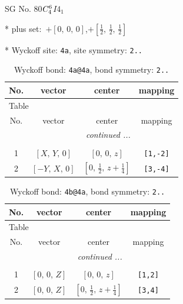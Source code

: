 \documentclass[fleqn,8pt]{jsarticle}
\begin{document}
\setcounter{MaxMatrixCols}{32}

\renewcommand{\tablename}{Table~}
\renewcommand{\figurename}{Figure~}
\begin{center}
\LARGE
SG No. 80\quad$C_{\rm 4}^{6}$\quad$I4_1$\quad[ tetragonal ]
\end{center}

* plus set:\,\,\,$+\left[ 0,\, 0,\, 0 \right]$,\quad $+\left[ \frac{1}{2},\, \frac{1}{2},\, \frac{1}{2} \right]$


* Wyckoff site: {\tt 4a}, site symmetry: {\tt 2..}
\renewcommand{\arraystretch}{1.2}
\begin{longtable}{cccc}
\caption{Wyckoff bond: {\tt 4a@4a}, bond symmetry: {\tt 2..}}
 \\
 \hline \hline
No. & vector & center & mapping \\ \hline \endfirsthead

\multicolumn{3}{l}{\tablename\ \thetable{}} \\
 \hline \hline
No. & vector & center & mapping \\ \hline \endhead

 \hline \hline
\multicolumn{3}{r}{\footnotesize\it continued ...} \\ \endfoot

 \hline \hline
\multicolumn{3}{r}{} \\ \endlastfoot

1 & $\left[ X,\, Y,\, 0 \right]$ & $\left[ 0,\, 0,\, z \right]$ & {\tt [1,-2]} \\ \hline
2 & $\left[ - Y,\, X,\, 0 \right]$ & $\left[ 0,\, \frac{1}{2},\, z + \frac{1}{4} \right]$ & {\tt [3,-4]} \\
\end{longtable}
\renewcommand{\arraystretch}{1.2}
\begin{longtable}{cccc}
\caption{Wyckoff bond: {\tt 4b@4a}, bond symmetry: {\tt 2..}}
 \\
 \hline \hline
No. & vector & center & mapping \\ \hline \endfirsthead

\multicolumn{3}{l}{\tablename\ \thetable{}} \\
 \hline \hline
No. & vector & center & mapping \\ \hline \endhead

 \hline \hline
\multicolumn{3}{r}{\footnotesize\it continued ...} \\ \endfoot

 \hline \hline
\multicolumn{3}{r}{} \\ \endlastfoot

1 & $\left[ 0,\, 0,\, Z \right]$ & $\left[ 0,\, 0,\, z \right]$ & {\tt [1,2]} \\ \hline
2 & $\left[ 0,\, 0,\, Z \right]$ & $\left[ 0,\, \frac{1}{2},\, z + \frac{1}{4} \right]$ & {\tt [3,4]} \\
\end{longtable}
\end{document}
